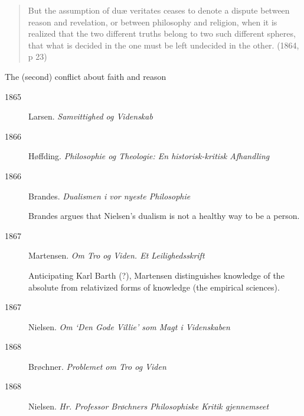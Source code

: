 \documentclass[ignorenonframetext, ]{beamer}
\begin{document}
\begin{frame}
  \begin{quote} But the assumption of duæ veritates ceases to denote a
    dispute between reason and revelation, or between philosophy and
    religion, when it is realized that the two different truths belong
    to two such different spheres, that what is decided in the one
    must be left undecided in the other. (1864, p 23)
  \end{quote}
\end{frame}

\begin{frame}{The (second) conflict about faith and reason}

  \begin{description}
  \item[1865] Larsen. \textit{Samvittighed og Videnskab}

  \item[1866] Høffding. \textit{Philosophie og Theologie: En
      historisk-kritisk Afhandling}
    
  \item[1866] Brandes. \emph{Dualismen i vor nyeste Philosophie}

    Brandes argues that Nielsen's dualism is not a healthy way to be a
    person.

  \end{description}

  \end{frame}


  \begin{frame}

    \begin{description}

  \item[1867] Martensen. \textit{Om Tro og Viden. Et Leilighedsskrift}

    Anticipating Karl Barth (?), Martensen distinguishes knowledge of
    the absolute from relativized forms of knowledge (the empirical
    sciences).

  \item[1867] Nielsen. \textit{Om `Den Gode Villie' som Magt i
      Videnskaben}

  \item[1868] Brøchner. \textit{Problemet om Tro og Viden}

  \item[1868] Nielsen. \textit{Hr. Professor Brøchners Philosophiske
      Kritik gjennemseet}

  \end{description}

\end{frame}
\end{document}
